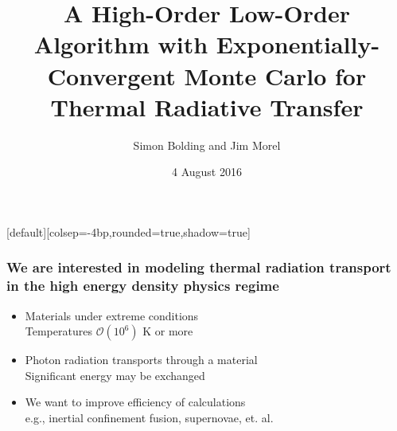\documentclass[xcolor=dvipsnames,hyperref={pdfpagelabels=false},unknownkeysallowed,
handout]{beamer}
\title[HOLO for TRT]{A High-Order Low-Order Algorithm with Exponentially-Convergent Monte Carlo for
    Thermal Radiative Transfer}
\author[S.R. Bolding]{{Simon Bolding and Jim Morel}}
\date{{4 August 2016} }
\newcommand{\colb}[1]{{\color{blue} #1}}
\newcommand{\colG}[1]{{\color{Gray!110} #1}}
\newlength{\wideitemsep}
\let\olditem\item
\renewcommand{\item}{\setlength{\itemsep}{\wideitemsep}\olditem}
\begin{document}
[default][colsep=-4bp,rounded=true,shadow=true]

\def\beginpage{\null\vfill\bgroup
\offinterlineskip\leftskip=\z@}
\def\endpage{\egroup\eject}

\begin{frame}
    \titlepage \vspace{-0.213in}
    \begin{center}
    \end{center}    
\end{frame}

\setlength{\tabcolsep}{6pt}



\begin{frame}
\frametitle{We are interested in modeling thermal radiation transport \\ in the high energy
    density physics regime}
    \addtolength{\wideitemsep}{0.08in}
\begin{itemize}
    \item[] Materials under extreme conditions \\ \colG{Temperatures $\mathcal{O}(10^6)$ K or more}
    \item[] Photon radiation transports through a material \\ 
        \colG{Significant \colb{energy}  may be exchanged}
 \item[] We want to improve efficiency of calculations \\
     \colG{e.g., inertial confinement fusion, supernovae, et. al.}
    \end{itemize}
\end{frame}
\end{document}
